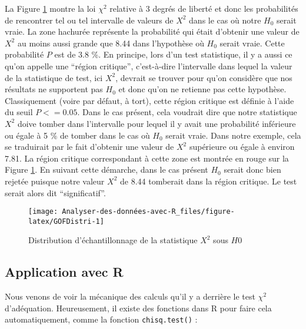 \documentclass[
  french,
]{book}
\newenvironment{Shaded}{\begin{snugshade}}{\end{snugshade}}
\newcommand{\DataTypeTok}[1]{\textcolor[rgb]{0.13,0.29,0.53}{#1}}
\newcommand{\FloatTok}[1]{\textcolor[rgb]{0.00,0.00,0.81}{#1}}
\newcommand{\KeywordTok}[1]{\textcolor[rgb]{0.13,0.29,0.53}{\textbf{#1}}}
\newcommand{\NormalTok}[1]{#1}
\newcommand{\OperatorTok}[1]{\textcolor[rgb]{0.81,0.36,0.00}{\textbf{#1}}}
\newcommand{\StringTok}[1]{\textcolor[rgb]{0.31,0.60,0.02}{#1}}
\begin{document}
La Figure \ref{fig:GOFDistri} montre la loi \(\chi^2\) relative à 3 degrés de liberté et donc les probabilités de rencontrer tel ou tel intervalle de valeurs de \(X^2\) dans le cas où notre \(H_{0}\) serait vraie. La zone hachurée représente la probabilité qui était d'obtenir une valeur de \(X^2\) au moins aussi grande que 8.44 dans l'hypothèse où \(H_{0}\) serait vraie. Cette probabilité \(P\) est de 3.8 \%. En principe, lors d'un test statistique, il y a aussi ce qu'on appelle une \enquote{région critique}, c'est-à-dire l'intervalle dans lequel la valeur de la statistique de test, ici \(X^2\), devrait se trouver pour qu'on considère que nos résultats ne supportent pas \(H_{0}\) et donc qu'on ne retienne pas cette hypothèse. Classiquement (voire par défaut, à tort), cette région critique est définie à l'aide du seuil \(P <= 0.05\). Dans le cas présent, cela voudrait dire que notre statistique \(X^2\) doive tomber dans l'intervalle pour lequel il y avait une probabilité inférieure ou égale à 5 \% de tomber dans le cas où \(H_{0}\) serait vraie. Dans notre exemple, cela se traduirait par le fait d'obtenir une valeur de \(X^2\) supérieure ou égale à environ 7.81. La région critique correspondant à cette zone est montrée en rouge sur la Figure \ref{fig:GOFDistri}. En suivant cette démarche, dans le cas présent \(H_{0}\) serait donc bien rejetée puisque notre valeur \(X^2\) de 8.44 tomberait dans la région critique. Le test serait alors dit \enquote{significatif}.

\begin{figure}

{\centering \texttt{[image: Analyser-des-données-avec-R\_files/figure-latex/GOFDistri-1]} 

}

\caption{Distribution d'échantillonnage de la statistique $X^2$ sous $H{0}$}\label{fig:GOFDistri}
\end{figure}

\hypertarget{application-avec-r}{%
\subsection{Application avec R}\label{application-avec-r}}

Nous venons de voir la mécanique des calculs qu'il y a derrière le test \(\chi^2\) d'adéquation. Heureusement, il existe des fonctions dans R pour faire cela automatiquement, comme la fonction \texttt{chisq.test()} :

\begin{Shaded}
\end{Shaded}
\end{document}
